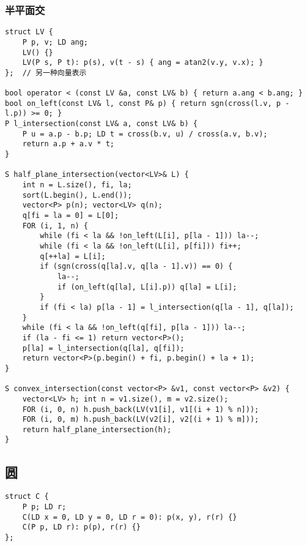 \documentclass[]{article}
\begin{document}
\hypertarget{ux534aux5e73ux9762ux4ea4}{%
\subsubsection{半平面交}\label{ux534aux5e73ux9762ux4ea4}}

\begin{verbatim}
struct LV {
    P p, v; LD ang;
    LV() {}
    LV(P s, P t): p(s), v(t - s) { ang = atan2(v.y, v.x); }
};  // 另一种向量表示

bool operator < (const LV &a, const LV& b) { return a.ang < b.ang; }
bool on_left(const LV& l, const P& p) { return sgn(cross(l.v, p - l.p)) >= 0; }
P l_intersection(const LV& a, const LV& b) {
    P u = a.p - b.p; LD t = cross(b.v, u) / cross(a.v, b.v);
    return a.p + a.v * t;
}

S half_plane_intersection(vector<LV>& L) {
    int n = L.size(), fi, la;
    sort(L.begin(), L.end());
    vector<P> p(n); vector<LV> q(n);
    q[fi = la = 0] = L[0];
    FOR (i, 1, n) {
        while (fi < la && !on_left(L[i], p[la - 1])) la--;
        while (fi < la && !on_left(L[i], p[fi])) fi++;
        q[++la] = L[i];
        if (sgn(cross(q[la].v, q[la - 1].v)) == 0) {
            la--;
            if (on_left(q[la], L[i].p)) q[la] = L[i];
        }
        if (fi < la) p[la - 1] = l_intersection(q[la - 1], q[la]);
    }
    while (fi < la && !on_left(q[fi], p[la - 1])) la--;
    if (la - fi <= 1) return vector<P>();
    p[la] = l_intersection(q[la], q[fi]);
    return vector<P>(p.begin() + fi, p.begin() + la + 1);
}

S convex_intersection(const vector<P> &v1, const vector<P> &v2) {
    vector<LV> h; int n = v1.size(), m = v2.size();
    FOR (i, 0, n) h.push_back(LV(v1[i], v1[(i + 1) % n]));
    FOR (i, 0, m) h.push_back(LV(v2[i], v2[(i + 1) % m]));
    return half_plane_intersection(h);
}
\end{verbatim}

\hypertarget{ux5706}{%
\subsection{圆}\label{ux5706}}

\begin{verbatim}
struct C {
    P p; LD r;
    C(LD x = 0, LD y = 0, LD r = 0): p(x, y), r(r) {}
    C(P p, LD r): p(p), r(r) {}
};
\end{verbatim}
\end{document}
